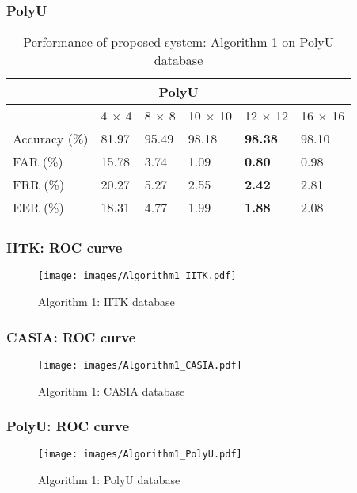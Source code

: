 \documentclass{beamer}
\begin{document}
\begin{frame}
\frametitle{PolyU}
\begin{table}[ht]
\centering 
\begin{tabular}{| l || l | l | l | l | l | }
    \hline
    \multicolumn{6}{|c|}{PolyU}\\
    \hline
    \hline
		  & 4 $\times$ 4 & 8 $\times$ 8 & 10 $\times$ 10 & 12 $\times$ 12 & 16 $\times$ 16 \\ \hline
    \hline
    Accuracy (\%) & 81.97        & 95.49	& 98.18		 & \textbf{98.38} & 98.10\\ \hline
    FAR (\%) 	  & 15.78        & 3.74		& 1.09 	     	 & \textbf{0.80} & 0.98\\ \hline
    FRR (\%)      & 20.27        & 5.27 	& 2.55 	     	 & \textbf{2.42} & 2.81\\ \hline
    EER (\%)      & 18.31        & 4.77	      	& 1.99  	 &  \textbf{1.88} & 2.08\\ \hline    
\end{tabular}
 \caption{Performance of proposed system: Algorithm 1 on PolyU database\label{table:exp1_polyu}}
\end{table}
\end{frame}

\begin{frame}
\frametitle{IITK: ROC curve}
\begin{figure}
	\begin{center}
	\texttt{[image: images/Algorithm1\_IITK.pdf]}
	\caption{Algorithm 1: IITK database}
	\end{center}
	\end{figure}
\end{frame}


\begin{frame}
\frametitle{CASIA: ROC curve}
\begin{figure}
	\begin{center}
	\texttt{[image: images/Algorithm1\_CASIA.pdf]}
	\caption{Algorithm 1: CASIA database}
	\end{center}
	\end{figure}
\end{frame}


\begin{frame}
\frametitle{PolyU: ROC curve}
\begin{figure}
	\begin{center}
	\texttt{[image: images/Algorithm1\_PolyU.pdf]}
	\caption{Algorithm 1: PolyU database}
	\end{center}
	\end{figure}
\end{frame}
\end{document}
